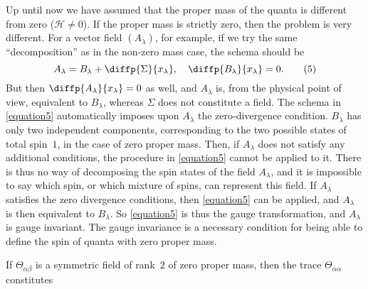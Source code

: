 \documentclass{article}
\newcommand{\HH}{\mathscr{H}}
\begin{document}
Up until now we have assumed that the proper mass of the quanta is different from zero ($\HH\neq0$).
If the proper mass is strictly zero, then the problem is very different.
For a vector field $(A_\lambda)$, for example, if we try the same ``decomposition'' as in the non-zero mass case, the schema should be
\[
\label{equation5}
  A_\lambda = B_\lambda + \diffp{\Sigma}{{x_\lambda}},
  \quad
  \diffp{{B_\lambda}}{{x_\lambda}} = 0.
  \tag{5}
\]
But then $\diffp{{A_\lambda}}{{x_\lambda}}=0$ as well, and $A_\lambda$ is, from the physical point of view, equivalent to $B_\lambda$, whereas $\Sigma$ does not constitute a field.
The schema in \cref{equation5} automatically imposes upon $A_\lambda$ the zero-divergence condition.
$B_\lambda$ has only two independent components, corresponding to the two possible states of total spin~$1$, in the case of zero proper mass.
Then, if $A_\lambda$ does not satisfy any additional conditions, the procedure in \cref{equation5} cannot be applied to it.
There is thus no way of decomposing the spin states of the field $A_\lambda$, and it is impossible to say which spin, or which mixture of spins, can represent this field.
If $A_\lambda$ satisfies the zero divergence conditions, then \cref{equation5} can be applied, and $A_\lambda$ is then equivalent to $B_\lambda$.
So \cref{equation5} is thus the gauge transformation, and $A_\lambda$ is gauge invariant.
The gauge invariance is a necessary condition for being able to define the spin of quanta with zero proper mass.

If $\Theta_{\alpha\beta}$ is a symmetric field of rank~$2$ of zero proper mass, then the trace $\Theta_{\alpha\alpha}$ constitutes
\end{document}
